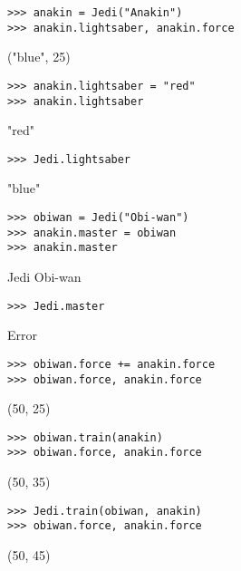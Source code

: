 \begin{blocksection}
\begin{lstlisting}
>>> anakin = Jedi("Anakin")
>>> anakin.lightsaber, anakin.force
\end{lstlisting}
\begin{solution}[.2in]
("blue", 25)
\end{solution}

\begin{lstlisting}
>>> anakin.lightsaber = "red"
>>> anakin.lightsaber 
\end{lstlisting}
\begin{solution}[.2in]
"red"
\end{solution}

\begin{lstlisting}
>>> Jedi.lightsaber 
\end{lstlisting}
\begin{solution}[.2in]
"blue"
\end{solution}

\begin{lstlisting}
>>> obiwan = Jedi("Obi-wan")
>>> anakin.master = obiwan
>>> anakin.master
\end{lstlisting}
\begin{solution}[.2in]
Jedi Obi-wan
\end{solution}

\begin{lstlisting}
>>> Jedi.master
\end{lstlisting}
\begin{solution}[.2in]
Error
\end{solution}

\begin{lstlisting}
>>> obiwan.force += anakin.force
>>> obiwan.force, anakin.force
\end{lstlisting}
\begin{solution}[.2in]
(50, 25)
\end{solution}

\begin{lstlisting}
>>> obiwan.train(anakin)
>>> obiwan.force, anakin.force
\end{lstlisting}
\begin{solution}[.2in]
(50, 35)
\end{solution}

\begin{lstlisting}
>>> Jedi.train(obiwan, anakin)
>>> obiwan.force, anakin.force
\end{lstlisting}
\begin{solution}[.2in]
(50, 45)
\end{solution}
\end{blocksection}
